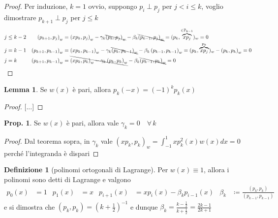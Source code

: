 \documentclass[a4paper,10pt]{article}
\theoremstyle{definition}
\theoremstyle{indentdefinition}
\newtheorem{defn}{Definizione}[section]
\theoremstyle{indenttheorem}
\newtheorem{prop}{Prop.}
\newtheorem{lem}{Lemma}
\theoremstyle{myremark}
\theoremstyle{indentgeneral}
\theoremstyle{plain}
\theoremstyle{plain}
\begin{document}
\begin{proof}
Per induzione, $k=1$ ovvio, suppongo $p_{i}\perp p_{j}$ per $j<i\leq k$,
voglio dimostrare $p_{k+1}\perp p_{j}$ per $j\leq k$
\begin{align*}
 & j\leq k-2 & \left(p_{k+1},p_{j}\right)_{w} & =\left(xp_{k},p_{j}\right)_{w}-\gamma_{k}\bcancel{\left(p_{k},p_{j}\right)_{w}}-\beta_{k}\bcancel{\left(p_{k-1},p_{j}\right)_{w}}=(p_{k},\overset{\in\mathbb{P}_{k-1}}{\overbrace{xp_{j}}})_{w}=0\\
 & j=k-1 & \left(p_{k+1},p_{k-1}\right)_{w} & =\left(xp_{k},p_{k-1}\right)_{w}-\gamma_{k}\bcancel{\left(p_{k},p_{k-1}\right)_{w}}-\beta_{k}\left(p_{k-1},p_{k-1}\right)_{w}=(p_{k},\overset{p_{k}}{\overbrace{xp_{j}}})_{w}-\left(p_{k},p_{k}\right)_{w}=0\\
 & j=k & \left(p_{k+1},p_{k-1}\right)_{w} & =\bcancel{\left(xp_{k},p_{k}\right)_{w}-\gamma_{k}\left(p_{k},p_{k}\right)_{w}}-\beta_{k}\bcancel{\left(p_{k-1},p_{k}\right)_{w}}=0
\end{align*}
\end{proof}
\begin{lem}
Se $w\left(x\right)$ è pari, allora $p_{k}\left(-x\right)=\left(-1\right)^{k}p_{k}\left(x\right)$
\end{lem}

\begin{proof}
{[}...{]}
\end{proof}
\begin{prop}
Se $w\left(x\right)$ è pari, allora vale $\gamma_{k}=0\quad\forall\,k$ 
\end{prop}

\begin{proof}
Dal teorema sopra, in $\gamma_{k}$ vale $\left(xp_{k},p_{k}\right)_{w}=\int_{-1}^{1}xp_{k}^{2}\left(x\right)w\left(x\right)dx=0$
perché l'integranda è dispari
\end{proof}
\begin{defn}[polinomi ortogonali di Lagrange]
Per $w\left(x\right)\equiv1$, allora i polinomi sono detti di Lagrange
e valgono
\begin{align*}
p_{0}\left(x\right) & =1 & p_{1}\left(x\right) & =x & p_{i+1}\left(x\right) & =xp_{i}\left(x\right)-\beta_{k}p_{i-1}\left(x\right) & \beta_{k} & \coloneqq\frac{\left(p_{k},p_{k}\right)}{\left(p_{k-1},p_{k-1}\right)}
\end{align*}
e si dimostra che $\left(p_{k},p_{k}\right)=\left(k+\frac{1}{2}\right)^{-1}$
e dunque $\beta_{k}=\frac{k-\frac{1}{2}}{k+\frac{1}{2}}=\frac{2k-1}{2k+1}$
\end{defn}
\end{document}

